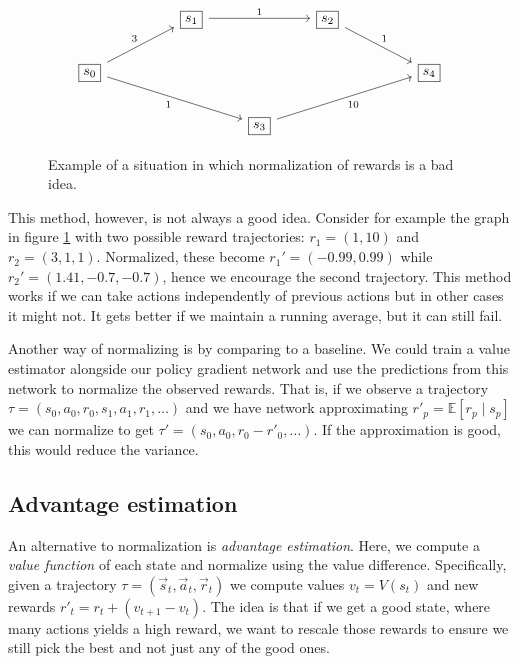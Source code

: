 \documentclass{article}
\theoremstyle{changedot}
\theoremstyle{changedotbreak}
\theoremstyle{nonumberplain}
\newcommand{\m}{\mathbb}
\begin{document}
\begin{figure} 
\[\begin{tikzcd}
	&& {\boxed{s_1}} && {\boxed{s_2}} \\
	{\boxed{s_0}} &&&&&& {\boxed{s_4}} \\
	&&& {\boxed{s_3}}
	\arrow["3", from=2-1, to=1-3]
	\arrow["1"', from=2-1, to=3-4]
	\arrow["1", from=1-3, to=1-5]
	\arrow["1", from=1-5, to=2-7]
	\arrow["10"', from=3-4, to=2-7]
\end{tikzcd}\]
\caption{Example of a situation in which normalization of rewards is a bad idea.}
\label{fig:bad_norm}
\end{figure}

This method, however, is not always a good idea. Consider for example the graph in figure \ref{fig:bad_norm} with two possible reward trajectories: $r_{1} = (1, 10)$ and $r_{2} = (3, 1, 1)$. Normalized, these become $r_{1}' = (-0.99, 0.99)$ while $r_{2}' = (1.41, -0.7, -0.7)$, hence we encourage the second trajectory. This method works if we can take actions independently of previous actions but in other cases it might not. It gets better if we maintain a running average, but it can still fail.

Another way of normalizing is by comparing to a baseline. We could train a value estimator alongside our policy gradient network and use the predictions from this network to normalize the observed rewards. That is, if we observe a trajectory $\tau = (s_{0}, a_{0}, r_{0}, s_{1}, a_{1}, r_{1}, \dots)$ and we have network approximating $r'_{p} = \m E[r_{p} \mid s_{p}]$ we can normalize to get $\tau' = (s_{0}, a_{0}, r_{0} - r'_{0}, \dots)$. If the approximation is good, this would reduce the variance.


\subsection{Advantage estimation}
An alternative to normalization is \emph{advantage estimation}. Here, we compute a \emph{value function} of each state and normalize using the value difference. Specifically, given a trajectory $\tau = (\overrightarrow s_{t}, \overrightarrow a_{t}, \overrightarrow r_{t})$ we compute values $v_{t} = V(s_{t})$ and new rewards $r'_{t} = r_{t} + (v_{t+1} - v_{t})$. The idea is that if we get a good state, where many actions yields a high reward, we want to rescale those rewards to ensure we still pick the best and not just any of the good ones.
\end{document}
